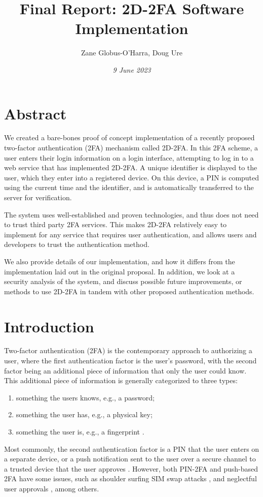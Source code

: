 \documentclass[11pt]{article}
\title{Final Report: 2D-2FA Software Implementation}
\author{Zane Globus-O'Harra, Doug Ure}
\date{\textit{9 June 2023}}
\begin{document}
\maketitle

\section*{Abstract}

We created a bare-bones proof of concept implementation of a recently
proposed two-factor authentication (2FA) mechanism called 2D-2FA. In
this 2FA scheme, a user enters their login information on a login
interface, attempting to log in to a web service that has implemented
2D-2FA. A unique identifier is displayed to the user, which they enter
into a registered device. On this device, a PIN is computed using the
current time and the identifier, and is automatically transferred to the
server for verification. 

The system uses well-established and proven technologies, and thus does
not need to trust third party 2FA services. This makes 2D-2FA relatively
easy to implement for any service that requires user authentication, and
allows users and developers to trust the authentication method. 

We also provide details of our implementation, and how it differs from
the implementation laid out in the original proposal. In addition, we
look at a security analysis of the system, and discuss possible future
improvements, or methods to use 2D-2FA in tandem with other proposed
authentication methods. 


\section{Introduction}

Two-factor authentication (2FA) is the contemporary approach to
authorizing a user, where the first authentication factor is the user's
password, with the second factor being an additional piece of
information that only the user could know. This additional piece of
information is generally categorized to three types:
\begin{enumerate}
    \item something the users knows, e.g., a password;
    \item something the user has, e.g., a physical key;
    \item something the user is, e.g., a fingerprint \cite{MFAProtocols}.
\end{enumerate}
Most commonly, the second authentication factor is a PIN that the user
enters on a separate device, or a push notification sent to the user
over a secure channel to a trusted device that the user approves
\cite{MFAProtocols}. However, both PIN-2FA and push-based 2FA have some
issues, such as shoulder surfing \cite{ShoulderSurfingWild,
ShoulderSurfingExperimental} SIM swap attacks \cite{Saha2016}, and
neglectful user approvals \cite{BypassingPush}, among others.
\end{document}
